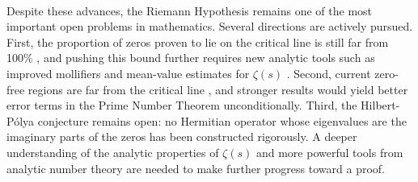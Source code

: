 \documentclass[10pt]{article}
\begin{document}
\paragraph{}
Despite these advances, the Riemann Hypothesis \cite{CarlsonJaffeWiles2023} 
remains one of the most important open problems in mathematics. 
Several directions are actively pursued. First, the proportion of zeros 
proven to lie on the critical line is still far from 100\% \cite{Conrey1989}, 
and pushing this bound further requires new analytic tools such as improved 
mollifiers and mean-value estimates for $\zeta(s)$ \cite{IwaniecKowalski2021}. 
Second, current zero-free regions are far from the critical line 
\cite{IwaniecKowalski2021}, and stronger results would yield better 
error terms in the Prime Number Theorem unconditionally. Third, the 
Hilbert-Pólya conjecture remains open: no Hermitian operator 
\cite{BerryKeating1999} whose eigenvalues are the imaginary parts 
of the zeros has been constructed rigorously. A deeper understanding of 
the analytic properties of $\zeta(s)$ \cite{GourdonSebah} 
and more powerful tools from analytic number theory 
\cite{IwaniecKowalski2021} are needed to make further progress 
toward a proof.


\end{document}
